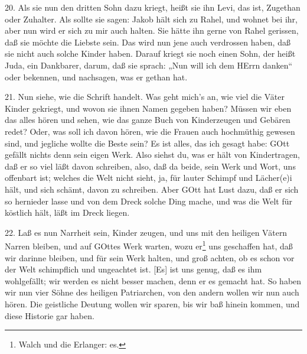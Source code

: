 20. Als sie nun den dritten Sohn dazu kriegt, heißt sie ihn Levi, das ist, Zugethan oder Zuhalter. Als sollte sie sagen: Jakob hält sich zu Rahel, und wohnet bei ihr, aber nun wird er sich zu mir auch halten. Sie hätte ihn gerne von Rahel gerissen, daß sie möchte die Liebste sein. Das wird nun jene auch verdrossen haben, daß sie nicht auch solche Kinder haben. Darauf kriegt sie noch einen Sohn, der heißt Juda, ein Dankbarer, darum, daß sie sprach: „Nun will ich dem HErrn danken“ oder bekennen, und nachsagen, was er gethan hat.

21. Nun siehe, wie die Schrift handelt. Was geht mich’s an, wie viel die Väter Kinder gekriegt, und wovon sie ihnen Namen gegeben haben? Müssen wir eben das alles hören und sehen, wie das ganze Buch von Kinderzeugen und Gebären redet? Oder, was soll ich davon hören, wie die Frauen auch hochmüthig gewesen sind, und jegliche wollte die Beste sein? Es ist alles, das ich gesagt habe: GOtt gefällt nichts denn sein eigen Werk. Also siehst du, was er hält von Kindertragen, daß er so viel läßt davon schreiben, also, daß da beide, sein Werk und Wort, uns offenbart ist; welches die Welt nicht sieht, ja, für lauter Schimpf und Lächer(e)i hält, und sich schämt, davon zu schreiben. Aber GOtt hat Lust dazu, daß er sich so hernieder lasse und von dem Dreck solche Ding mache, und was die Welt für köstlich hält, läßt im Dreck liegen.

22. Laß es nun Narrheit sein, Kinder zeugen, und uns mit den heiligen Vätern Narren bleiben, und auf GOttes Werk warten, wozu er\footnote{Walch und die Erlanger: es.} uns geschaffen hat, daß wir darinne bleiben, und für sein Werk halten, und groß achten, ob es schon vor der Welt schimpflich und ungeachtet ist. [Es] ist uns genug, daß es ihm wohlgefällt; wir werden es nicht besser machen, denn er es gemacht hat. So haben wir nun vier Söhne des heiligen Patriarchen, von den andern wollen wir nun auch hören. Die geistliche Deutung wollen wir sparen, bis wir baß hinein kommen, und diese Historie gar haben.

